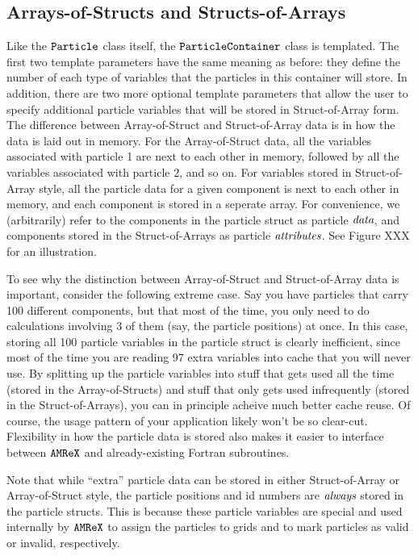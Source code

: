 \subsection{Arrays-of-Structs and Structs-of-Arrays}

Like the $\tt{Particle}$ class itself, the $\tt{ParticleContainer}$ class is templated. The first two template parameters have the same meaning as before: they define the number of each type of variables that the particles in this container will store. In addition, there are two more optional template parameters that allow the user to specify additional particle
variables that will be stored in Struct-of-Array form. The difference between Array-of-Struct and Struct-of-Array data is in how the data is laid
out in memory. For the Array-of-Struct data, all the variables associated with particle 1 are next to each other in memory, followed by all the variables associated with particle
2, and so on. For variables stored in Struct-of-Array style, all the particle data for a given component is next to each other in memory, and each component is stored in a seperate
array. For convenience, we (arbitrarily) refer to the components in the particle struct as particle $\emph{data}$, and components stored in the Struct-of-Arrays as particle
$\emph{attributes}$. See Figure XXX for an illustration.

To see why the distinction between Array-of-Struct and Struct-of-Array data is important, consider the following extreme case. Say you have particles that carry 100 different components,
but that most of the time, you only need to do calculations involving 3 of them (say, the particle positions) at once. In this case, storing all 100 particle variables in the particle
struct is clearly inefficient, since most of the time you are reading 97 extra variables into cache that you will never use. By splitting up the particle variables into stuff that gets 
used all the time (stored in the Array-of-Structs) and stuff that only gets used infrequently (stored in the Struct-of-Arrays), you can in principle acheive much better cache reuse. Of course, the usage pattern of your application likely won't be so clear-cut. Flexibility in how the particle data is stored also makes it easier to interface between $\tt{AMReX}$ and already-existing Fortran subroutines.

Note that while ``extra'' particle data can be stored in either Struct-of-Array or Array-of-Struct style, the particle positions and id numbers are $\emph{always}$ stored in the particle
structs. This is because these particle variables are special and used internally by $\tt{AMReX}$ to assign the particles to grids and to mark particles as valid or invalid, respectively.

